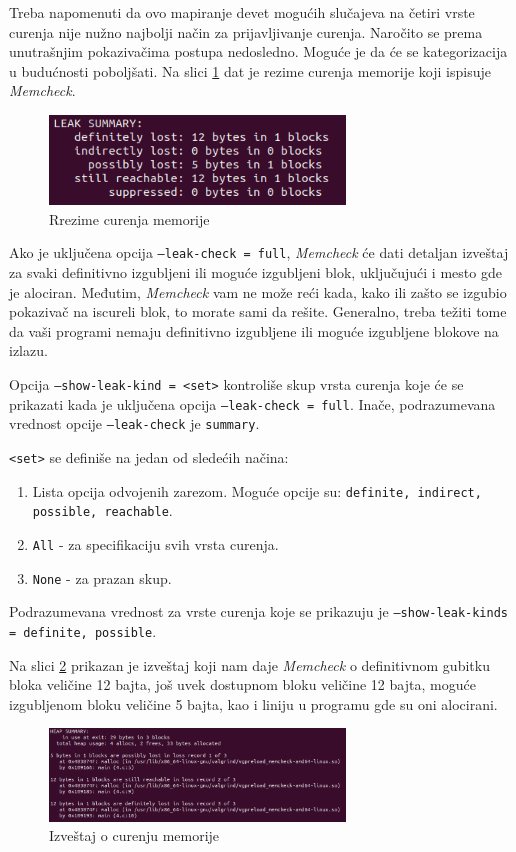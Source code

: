 \documentclass[12pt,oneside]{memoir}
\theoremstyle{plain}
\theoremstyle{definition}
\begin{document}
Treba napomenuti da ovo mapiranje devet mogućih slučajeva na četiri vrste curenja nije nužno najbolji način za prijavljivanje curenja. Naročito se prema unutrašnjim pokazivačima postupa nedosledno. Moguće je da će se kategorizacija u budućnosti poboljšati. Na slici  \ref{fig:slika2.13} dat je rezime curenja memorije koji ispisuje \textit{Memcheck}.
\begin{figure}[!ht]
  \centering
  \includegraphics[width=0.7\textwidth]{leakResume.png}
  \caption{Rrezime curenja memorije}
  \label{fig:slika2.13}
\end{figure}

Ako je uključena opcija \texttt{--leak-check = full}, \textit{Memcheck} će dati detaljan izveštaj za svaki definitivno izgubljeni ili moguće izgubljeni blok, uključujući i mesto gde je alociran. Međutim, \textit{Memcheck} vam ne može reći kada, kako ili zašto se izgubio pokazivač na iscureli blok, to morate sami da rešite. Generalno, treba težiti tome da vaši programi nemaju definitivno izgubljene ili moguće izgubljene blokove na izlazu.

Opcija \texttt{--show-leak-kind = <set>} kontroliše skup vrsta curenja koje će se prikazati kada je uključena opcija \texttt{--leak-check = full}. Inače, podrazumevana vrednost opcije \texttt{–leak-check} je \texttt{summary}.

\texttt{<set>} se definiše na jedan od sledećih načina:
\begin{enumerate}
\item Lista opcija odvojenih zarezom. Moguće opcije su: \texttt{definite, indirect, possible, reachable}.
\item \texttt{All} - za specifikaciju svih vrsta curenja.
\item \texttt{None} -  za prazan skup.
\end{enumerate}
Podrazumevana vrednost za vrste curenja koje se prikazuju je \texttt{--show-leak-kinds = definite, possible}.

Na slici \ref{fig:slika2.14} prikazan je izveštaj koji nam daje \textit{Memcheck} o definitivnom gubitku bloka veličine 12 bajta, još uvek dostupnom bloku veličine 12 bajta, moguće izgubljenom bloku veličine 5 bajta, kao i liniju u programu gde su oni alocirani. 
\begin{figure}[!ht]
  \centering
  \includegraphics[width=0.7\textwidth]{heapResume.png}
  \caption{Izveštaj o curenju memorije}
  \label{fig:slika2.14}
\end{figure}
\end{document}
